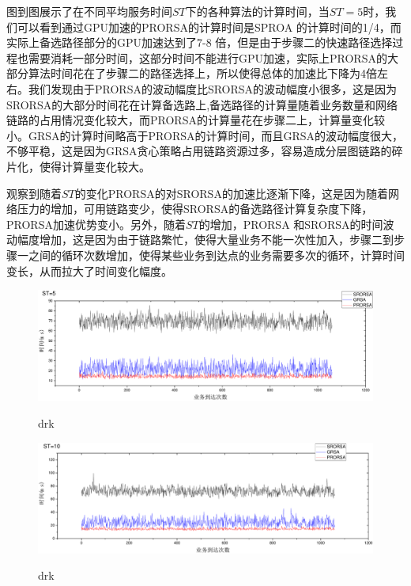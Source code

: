 图到图展示了在不同平均服务时间$ST$下的各种算法的计算时间，当$ST=5$时，我们可以看到通过GPU加速的PRORSA的计算时间是SPROA 的计算时间的1/4，而实际上备选路径部分的GPU加速达到了7-8 倍，但是由于步骤二的快速路径选择过程也需要消耗一部分时间，这部分时间不能进行GPU加速，实际上PRORSA的大部分算法时间花在了步骤二的路径选择上，所以使得总体的加速比下降为4倍左右。我们发现由于PRORSA的波动幅度比SRORSA的波动幅度小很多，这是因为SRORSA的大部分时间花在计算备选路上,备选路径的计算量随着业务数量和网络链路的占用情况变化较大，而PRORSA的计算量花在步骤二上，计算量变化较小。GRSA的计算时间略高于PRORSA的计算时间，而且GRSA的波动幅度很大，不够平稳，这是因为GRSA贪心策略占用链路资源过多，容易造成分层图链路的碎片化，使得计算量变化较大。
 
观察到随着$ST$的变化PRORSA的对SRORSA的加速比逐渐下降，这是因为随着网络压力的增加，可用链路变少，使得SRORSA的备选路径计算复杂度下降，PRORSA加速优势变小。另外，随着$ST$的增加，PRORSA 和SRORSA的时间波动幅度增加，这是因为由于链路繁忙，使得大量业务不能一次性加入，步骤二到步骤一之间的循环次数增加，使得某些业务到达点的业务需要多次的循环，计算时间变长，从而拉大了时间变化幅度。
\begin{figure}
\setlength{\belowcaptionskip}{-0.5cm}
  \begin{center}
    {\includegraphics[width=1 \textwidth]{figures/B5T.pdf}}
    \end{center}
  \caption{{\footnotesize{drk}}}
  \label{drk}
\end{figure}
\begin{figure}
\setlength{\belowcaptionskip}{-0.5cm}
  \begin{center}
    {\includegraphics[width=1 \textwidth]{figures/B10T.pdf}}
    \end{center}
  \caption{{\footnotesize{drk}}}
  \label{drk}
\end{figure}
